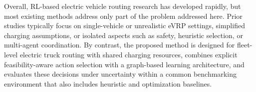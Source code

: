 \documentclass[a4paper,fleqn]{cas-sc}
\begin{document}
Overall, RL-based electric vehicle routing research has developed rapidly, but most existing methods address only part of the problem addressed here. Prior studies typically focus on single-vehicle or unrealistic eVRP settings, simplified charging assumptions, or isolated aspects such as safety, heuristic selection, or multi-agent coordination. By contrast, the proposed method is designed for fleet-level electric truck routing with shared charging resources, combines explicit feasibility-aware action selection with a graph-based learning architecture, and evaluates these decisions under uncertainty within a common benchmarking environment that also includes heuristic and optimization baselines.






\end{document}
